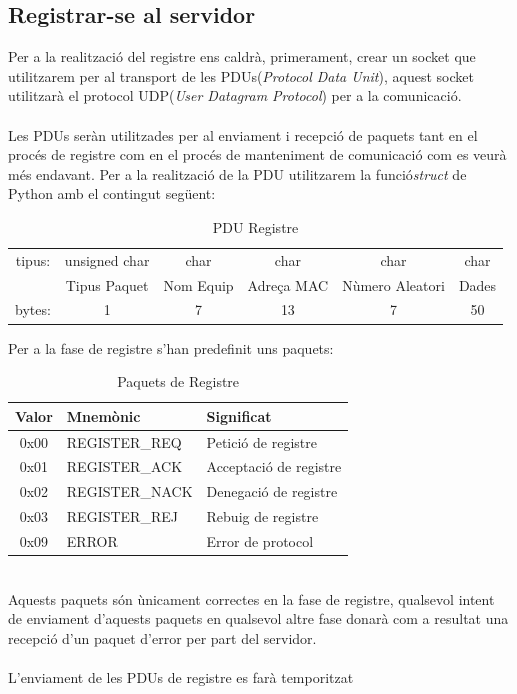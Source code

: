 \documentclass[11pt]{article}
\begin{document}
	\subsection{Registrar-se al servidor}
Per a la realització del registre ens caldrà, primerament, crear un socket que utilitzarem per al transport de les PDUs(\textit{Protocol Data Unit}), aquest socket utilitzarà el protocol UDP(\textit{User Datagram Protocol}) per a la comunicació.
\\\\
Les PDUs seràn utilitzades per al enviament i recepció de paquets tant en el procés de registre com en el procés de manteniment de comunicació com es veurà més endavant. Per a la realització de la PDU utilitzarem la funció\textit{struct} de Python amb el contingut següent:
\begin{table}[h]

\def\arraystretch{1.5}
\begin{tabular}{ c c c c c c}
tipus: & unsigned char & char &  char & char & char\\
\cline{2-6}
& \multicolumn{1}{|c|}{Tipus Paquet} & \multicolumn{1}{|c|}{Nom Equip} & \multicolumn{1}{|c|}{Adreça MAC} & \multicolumn{1}{|c|}{Nùmero Aleatori} & \multicolumn{1}{|c|}{Dades}\\
\cline{2-6}
bytes: & 1 & 7 & 13 & 7 & 50
	\end{tabular}
	\caption{PDU Registre}
	\label{tab:PDUReg}
\end{table}
\newpage
Per a la fase de registre s'han predefinit uns paquets:\\
\begin{table}[h]
\centering
\def\arraystretch{1.5}
\begin{tabular}{ c l l }
\hline
Valor & Mnemònic & Significat\\
\hline
\hline
0x00 & REGISTER\_REQ & Petició de registre\\
0x01 & REGISTER\_ACK & Acceptació de registre\\
0x02 & REGISTER\_NACK & Denegació de registre\\
0x03 & REGISTER\_REJ & Rebuig de registre\\
0x09 & ERROR & Error de protocol\\
\hline
	\end{tabular}
	\caption{Paquets de Registre}
	\label{tab:PaquetsRegistre}
\end{table}
\\
Aquests paquets són ùnicament correctes en la fase de registre, qualsevol intent de enviament d'aquests paquets en qualsevol altre fase donarà com a resultat una recepció d'un paquet d'error per part del servidor.
\\\\
L'enviament de les PDUs de registre es farà temporitzat
\end{document}
